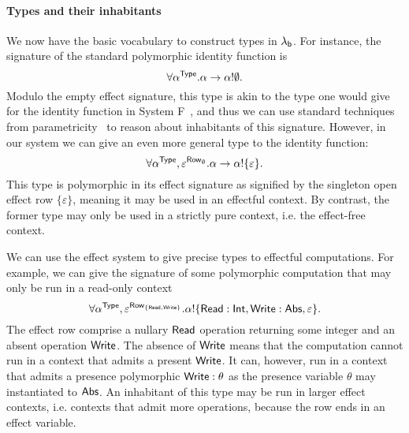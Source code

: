 \documentclass[12pt,phd,lfcs,twoside,openright,logo,leftchapter,normalheadings]{infthesis}
\theoremstyle{plain}
\theoremstyle{definition}
\begin{document}
\paragraph{Types and their inhabitants}
We now have the basic vocabulary to construct types in $\lambda_{\mathsf{b}}$. For
instance, the signature of the standard polymorphic identity function
is
%
\[
  \forall \alpha^{\mathsf{Type}}. \alpha \to \alpha ! \emptyset.
\]
%
Modulo the empty effect signature, this type is akin to the type one
would give for the identity function in System
F~\cite{Girard72,Reynolds74}, and thus we can use standard techniques
from parametricity~\cite{Wadler89} to reason about inhabitants of this
signature. However, in our system we can give an even more general
type to the identity function:
%
\[
  \forall \alpha^{\mathsf{Type}},\varepsilon^{\mathsf{Row}_\emptyset}. \alpha \to \alpha ! \{\varepsilon\}.
\]
%
This type is polymorphic in its effect signature as signified by the
singleton open effect row $\{\varepsilon\}$, meaning it may be used in
an effectful context. By contrast, the former type may only be used in
a strictly pure context, i.e. the effect-free context.
%
%

We can use the effect system to give precise types to effectful
computations. For example, we can give the signature of some
polymorphic computation that may only be run in a read-only context
%
\[
  \forall \alpha^{\mathsf{Type}}, \varepsilon^{\mathsf{Row}_{\{\mathsf{Read},\mathsf{Write}\}}}. \alpha ! \{\mathsf{Read}:\mathsf{Int},\mathsf{Write}:\mathsf{Abs},\varepsilon\}.
\]
%
The effect row comprise a nullary $\mathsf{Read}$ operation returning some
integer and an absent operation $\mathsf{Write}$. The absence of $\mathsf{Write}$
means that the computation cannot run in a context that admits a
present $\mathsf{Write}$.  It can, however, run in a context that admits a
presence polymorphic $\mathsf{Write} : \theta$ as the presence variable
$\theta$ may instantiated to $\mathsf{Abs}$. An inhabitant of this type may be
run in larger effect contexts, i.e. contexts that admit more
operations, because the row ends in an effect variable.
%
\end{document}
